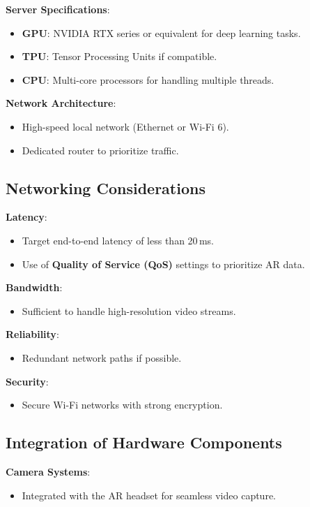 \documentclass{article}
\begin{document}
\textbf{Server Specifications}:
\begin{itemize}
    \item \textbf{GPU}: NVIDIA RTX series or equivalent for deep learning tasks.
    \item \textbf{TPU}: Tensor Processing Units if compatible.
    \item \textbf{CPU}: Multi-core processors for handling multiple threads.
\end{itemize}

\textbf{Network Architecture}:
\begin{itemize}
    \item High-speed local network (Ethernet or Wi-Fi 6).
    \item Dedicated router to prioritize traffic.
\end{itemize}

\subsection{Networking Considerations}

\textbf{Latency}:
\begin{itemize}
    \item Target end-to-end latency of less than 20\,ms.
    \item Use of \textbf{Quality of Service (QoS)} settings to prioritize AR data.
\end{itemize}

\textbf{Bandwidth}:
\begin{itemize}
    \item Sufficient to handle high-resolution video streams.
\end{itemize}

\textbf{Reliability}:
\begin{itemize}
    \item Redundant network paths if possible.
\end{itemize}

\textbf{Security}:
\begin{itemize}
    \item Secure Wi-Fi networks with strong encryption.
\end{itemize}

\subsection{Integration of Hardware Components}

\textbf{Camera Systems}:
\begin{itemize}
    \item Integrated with the AR headset for seamless video capture.
\end{itemize}
\end{document}
